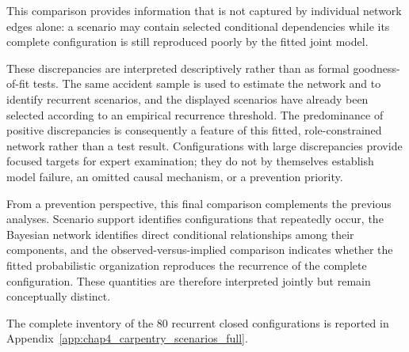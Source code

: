 This comparison provides information that is not captured by individual
network edges alone: a scenario may contain selected conditional dependencies
while its complete configuration is still reproduced poorly by the fitted
joint model.

These discrepancies are interpreted descriptively rather than as formal
goodness-of-fit tests. The same accident sample is used to estimate the
network and to identify recurrent scenarios, and the displayed scenarios have
already been selected according to an empirical recurrence threshold. The
predominance of positive discrepancies is consequently a feature of this
fitted, role-constrained network rather than a test result. Configurations
with large discrepancies provide focused targets for expert examination; they
do not by themselves establish model failure, an omitted causal mechanism, or
a prevention priority.

From a prevention perspective, this final comparison complements the previous
analyses. Scenario support identifies configurations that repeatedly occur,
the Bayesian network identifies direct conditional relationships among their
components, and the observed-versus-implied comparison indicates whether the
fitted probabilistic organization reproduces the recurrence of the complete
configuration. These quantities are therefore interpreted jointly but remain
conceptually distinct.

The complete inventory of the 80 recurrent closed configurations is reported
in Appendix~\ref{app:chap4_carpentry_scenarios_full}.
